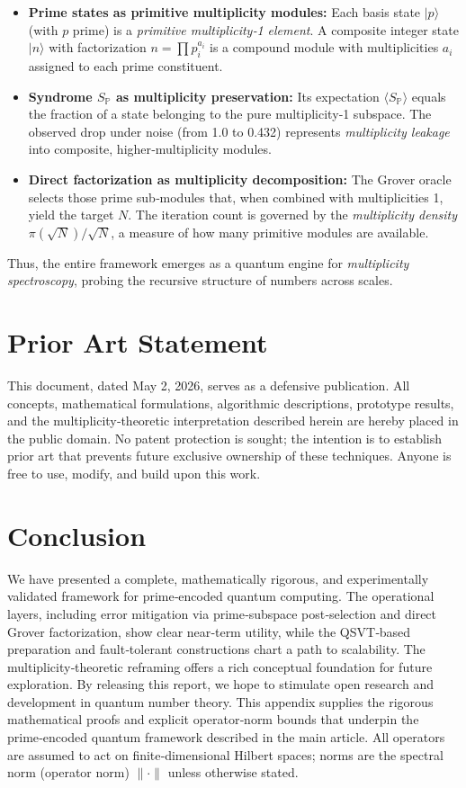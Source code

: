 \documentclass[12pt,a4paper]{article}
\begin{document}
\begin{itemize}
    \item \textbf{Prime states as primitive multiplicity modules:} Each basis state \(|p\rangle\) (with \(p\) prime) is a \emph{primitive multiplicity‑1 element}. A composite integer state \(|n\rangle\) with factorization \(n = \prod p_i^{a_i}\) is a compound module with multiplicities \(a_i\) assigned to each prime constituent.
    \item \textbf{Syndrome \(S_{\mathbb{P}}\) as multiplicity preservation:} Its expectation \(\langle S_{\mathbb{P}}\rangle\) equals the fraction of a state belonging to the pure multiplicity‑1 subspace. The observed drop under noise (from 1.0 to 0.432) represents \emph{multiplicity leakage} into composite, higher‑multiplicity modules.
    \item \textbf{Direct factorization as multiplicity decomposition:} The Grover oracle selects those prime sub‑modules that, when combined with multiplicities 1, yield the target \(N\). The iteration count is governed by the \emph{multiplicity density} \(\pi(\sqrt{N})/\sqrt{N}\), a measure of how many primitive modules are available.
\end{itemize}

Thus, the entire framework emerges as a quantum engine for \emph{multiplicity spectroscopy}, probing the recursive structure of numbers across scales.

\section{Prior Art Statement}

This document, dated May 2, 2026, serves as a defensive publication. All concepts, mathematical formulations, algorithmic descriptions, prototype results, and the multiplicity‑theoretic interpretation described herein are hereby placed in the public domain. No patent protection is sought; the intention is to establish prior art that prevents future exclusive ownership of these techniques. Anyone is free to use, modify, and build upon this work.

\section{Conclusion}

We have presented a complete, mathematically rigorous, and experimentally validated framework for prime‑encoded quantum computing. The operational layers, including error mitigation via prime‑subspace post‑selection and direct Grover factorization, show clear near‑term utility, while the QSVT‑based preparation and fault‑tolerant constructions chart a path to scalability. The multiplicity‑theoretic reframing offers a rich conceptual foundation for future exploration. By releasing this report, we hope to stimulate open research and development in quantum number theory.
\appendix
This appendix supplies the rigorous mathematical proofs and explicit operator‑norm bounds that underpin the prime‑encoded quantum framework described in the main article.  All operators are assumed to act on finite‑dimensional Hilbert spaces; norms are the spectral norm (operator norm) \(\|\cdot\|\) unless otherwise stated.
\end{document}
